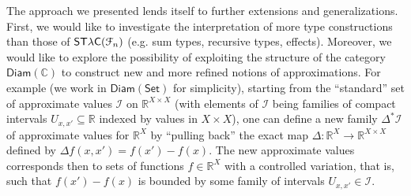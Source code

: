 %
%
%
%
%
%
%
%
%

The approach we presented lends itself to further extensions and generalizations.
First, we would like to investigate the interpretation of more type constructions than those of $\mathsf{ST\lambda C}(\mathcal F_{n})$ (e.g. sum types, recursive types, effects). Moreover, we would like to explore the possibility of exploiting the structure of the category $\mathsf{Diam}(\mathbb C)$ to construct new and more refined notions of approximations.
For example (we work in $\mathsf{Diam}(\mathsf{Set})$ for simplicity), 
starting from the ``standard'' set of approximate values $\mathcal I$ on $\mathbb{R}^{X\times X}$ (with elements of $\mathcal I$ being  families of compact intervals $U_{x,x'}\subseteq \mathbb R$ indexed by values in $X\times X$), one can define a new family  $\Delta^{*}\mathcal I$  of approximate values for  $\mathbb R^{X}$ by ``pulling back'' the exact map 
$\Delta:
\mathbb R^{X} \to \mathbb R^{X\times X}$ defined by $\Delta f(x,x')=f(x')-f(x)$. 
The new approximate values corresponds then to sets of functions $f\in \mathbb R^{X}$ with a controlled variation, that is, such that $f(x')-f(x)$ is bounded by some family of intervals $U_{x,x'} \in \mathcal I$.





